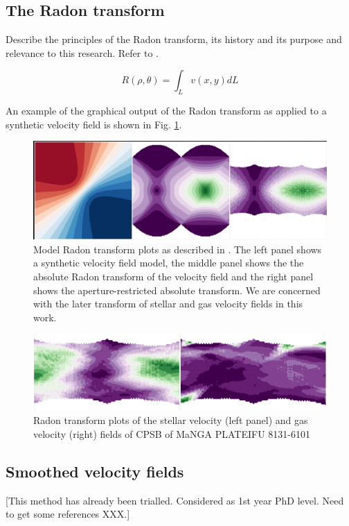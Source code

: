 \subsection{The Radon transform}
Describe the principles of the Radon transform, its history and its purpose and relevance to this research. Refer to \cite{2018MNRAS.480.2217S}.

\begin{equation}
    \label{eqn:radon}
    R(\rho,\theta)=\int_{L}{v(x,y) dL} 
\end{equation}

An example of the graphical output of the Radon transform as applied to a synthetic velocity field is shown in Fig. \ref{fig:Radon}.

\begin{figure}
    \centering
   	\includegraphics[width=\columnwidth]{images/RadonPlots/example2.png}
    \caption{Model Radon transform plots as described in \citet{2018MNRAS.480.2217S}. The left panel shows a synthetic velocity field model, the middle panel shows the the absolute Radon transform of the velocity field and the right panel shows the aperture-restricted absolute transform. We are concerned with the later transform of stellar and gas velocity fields in this work.}
    \label{fig:Radon}
\end{figure}


\begin{figure}
    \centering
   	\includegraphics[width=\columnwidth]{images/RadonPlots/RT-snips/CPSB-8313-6101-RT-snip.png}
    \caption{Radon transform plots of the stellar velocity (left panel) and gas velocity (right) fields of CPSB of MaNGA PLATEIFU 8131-6101}
    \label{fig:RT_8131-6101}
\end{figure}

\subsection{Smoothed velocity fields}
[This method has already been trialled. Considered as 1st year PhD level. Need to get some references XXX.]